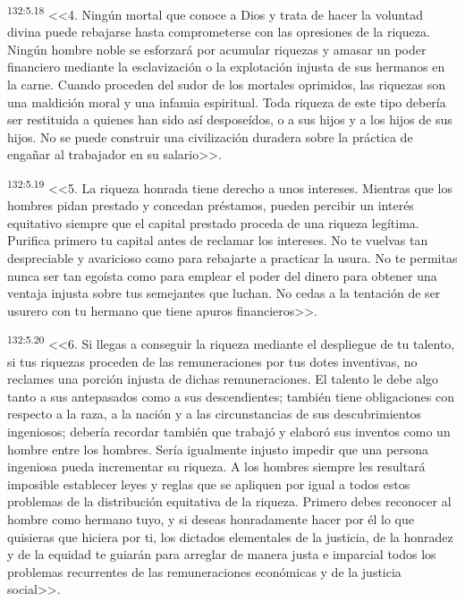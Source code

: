 \par 
\textsuperscript{132:5.18} <<4. Ningún mortal que conoce a Dios y trata de hacer la voluntad divina puede rebajarse hasta comprometerse con las opresiones de la riqueza. Ningún hombre noble se esforzará por acumular riquezas y amasar un poder financiero mediante la esclavización o la explotación injusta de sus hermanos en la carne. Cuando proceden del sudor de los mortales oprimidos, las riquezas son una maldición moral y una infamia espiritual. Toda riqueza de este tipo debería ser restituida a quienes han sido así desposeídos, o a sus hijos y a los hijos de sus hijos. No se puede construir una civilización duradera sobre la práctica de engañar al trabajador en su salario>>.

\par 
\textsuperscript{132:5.19} <<5. La riqueza honrada tiene derecho a unos intereses. Mientras que los hombres pidan prestado y concedan préstamos, pueden percibir un interés equitativo siempre que el capital prestado proceda de una riqueza legítima. Purifica primero tu capital antes de reclamar los intereses. No te vuelvas tan despreciable y avaricioso como para rebajarte a practicar la usura. No te permitas nunca ser tan egoísta como para emplear el poder del dinero para obtener una ventaja injusta sobre tus semejantes que luchan. No cedas a la tentación de ser usurero con tu hermano que tiene apuros financieros>>.

\par 
\textsuperscript{132:5.20} <<6. Si llegas a conseguir la riqueza mediante el despliegue de tu talento, si tus riquezas proceden de las remuneraciones por tus dotes inventivas, no reclames una porción injusta de dichas remuneraciones. El talento le debe algo tanto a sus antepasados como a sus descendientes; también tiene obligaciones con respecto a la raza, a la nación y a las circunstancias de sus descubrimientos ingeniosos; debería recordar también que trabajó y elaboró sus inventos como un hombre entre los hombres. Sería igualmente injusto impedir que una persona ingeniosa pueda incrementar su riqueza. A los hombres siempre les resultará imposible establecer leyes y reglas que se apliquen por igual a todos estos problemas de la distribución equitativa de la riqueza. Primero debes reconocer al hombre como hermano tuyo, y si deseas honradamente hacer por él lo que quisieras que hiciera por ti, los dictados elementales de la justicia, de la honradez y de la equidad te guiarán para arreglar de manera justa e imparcial todos los problemas recurrentes de las remuneraciones económicas y de la justicia social>>.

